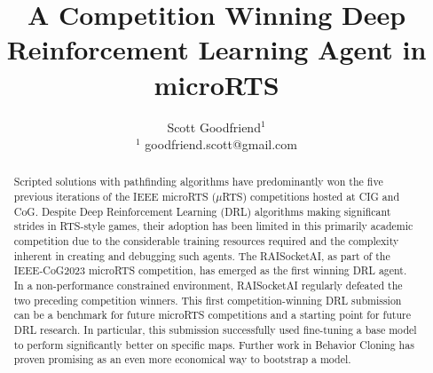\documentclass{article}
\begin{document}
\title{A Competition Winning Deep Reinforcement Learning Agent in microRTS}
\author{Scott Goodfriend$^{1}$ \\
$^{1}$ goodfriend.scott@gmail.com \\
}
\maketitle
\begin{abstract}
    Scripted solutions with pathfinding algorithms have predominantly won the five
    previous iterations of the IEEE microRTS ($\mu$RTS) competitions hosted at CIG and
    CoG. Despite Deep Reinforcement Learning (DRL) algorithms making significant strides
    in RTS-style games, their adoption has been limited in this primarily academic
    competition due to the considerable training resources required and the complexity
    inherent in creating and debugging such agents. The RAISocketAI, as part of the
    IEEE-CoG2023 microRTS competition, has emerged as the first winning DRL agent. In a
    non-performance constrained environment, RAISocketAI regularly defeated the two
    preceding competition winners. This first competition-winning DRL submission can be
    a benchmark for future microRTS competitions and a starting point for future DRL
    research. In particular, this submission successfully used fine-tuning a base model
    to perform significantly better on specific maps. Further work in Behavior Cloning
    has proven promising as an even more economical way to bootstrap a model.
\end{abstract}
\end{document}
